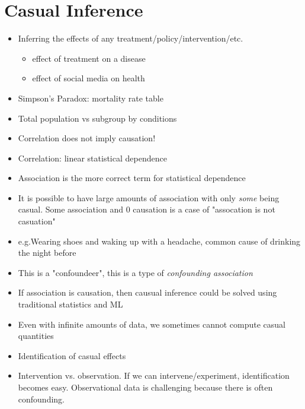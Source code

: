 \documentclass[../main.tex]{subfiles}
\begin{document}
\section{Casual Inference}
  \begin{itemize}
    \item Inferring the effects of any treatment/policy/intervention/etc.
    \begin{itemize}
      \item effect of treatment on a disease
      \item effect of social media on health
    \end{itemize}
    \item Simpson's Paradox: mortality rate table
    \item Total population vs subgroup by conditions
    \item Correlation does not imply causation!
    \item Correlation: linear statistical dependence
    \item Association is the more correct term for statistical dependence
    \item It is possible to have large amounts of association with only \textit{some} being casual. Some association and 0 causation is a case of "assocation is not casuation"
    \item e.g.Wearing shoes and waking up with a headache, common cause of drinking the night before
    \item This is a "confoundeer", this is a type of \textit{confounding association}
    \item If association is causation, then causual inference could be solved using traditional statistics and ML
    \item Even with infinite amounts of data, we sometimes cannot compute casual quantities
    \item Identification of casual effects
    \item Intervention vs. observation. If we can intervene/experiment, identification becomes easy. Observational data is challenging because there is often confounding.
  \end{itemize}
\end{document}
